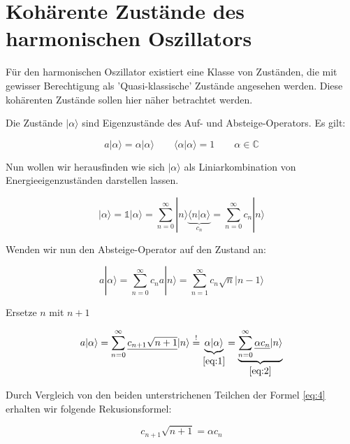 



\section*{Kohärente Zustände des harmonischen Oszillators}

Für den harmonischen Oszillator existiert eine Klasse von Zuständen, die mit gewisser Berechtigung als 'Quasi-klassische' Zustände angesehen werden. Diese kohärenten Zustände sollen hier näher betrachtet werden.

Die Zustände \(|\alpha\rangle \) sind Eigenzustände des Auf- und Absteige-Operators. Es gilt:

\begin{equation}
  \label{eq:1}
  a|\alpha\rangle =\alpha|\alpha\rangle \qquad \langle \alpha | \alpha \rangle =1 \qquad \alpha \in \mathbb C
\end{equation}


Nun wollen wir herausfinden wie sich \(|\alpha\rangle\) als Liniarkombination von Energieeigenzuständen darstellen lassen. 

\begin{equation}
  \label{eq:2}
  |\alpha\rangle = \mathbb 1 |\alpha\rangle = \sum_{n=0}^{\infty}|n\rangle\underbrace{ \langle n|\alpha\rangle }_{c_n} = \sum_{n=0}^{\infty} c_n|n\rangle 
\end{equation}

Wenden wir nun den Absteige-Operator auf den Zustand an:

\begin{equation}
  \label{eq:3}
  a|\alpha\rangle = \sum_{n=0}^{\infty} c_n a|n\rangle=\sum_{n=1}^{\infty} c_n \sqrt{n}|n-1\rangle
\end{equation}

Ersetze \(n\) mit \(n+1\)

\begin{equation}
  \label{eq:4}
  a|\alpha\rangle = \sum_{n=0}^{\infty} \underline{c_{n+1} \sqrt{n+1}}|n\rangle \stackrel{!}= \underbrace{ \alpha|\alpha\rangle}_{\eqref{eq:1}}  = \underbrace{ \sum_{n=0}^{\infty} \underline{\alpha c_n} |n\rangle }_{\eqref{eq:2} }
\end{equation}

Durch Vergleich von den beiden unterstrichenen Teilchen der Formel \eqref{eq:4} erhalten wir folgende Rekusionsformel:

\begin{equation}
  \label{eq:5}
  c_{n+1}\sqrt{n+1} = \alpha c_n
\end{equation}

